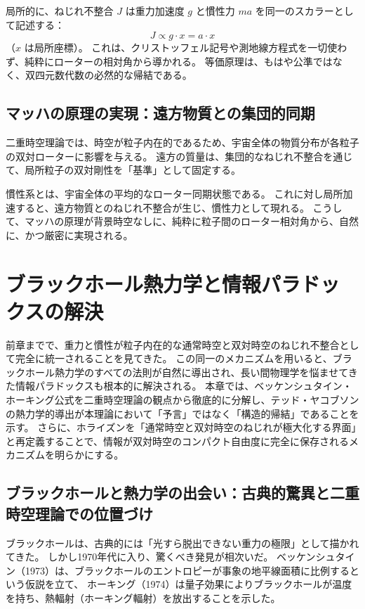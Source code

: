 \documentclass[dvipdfmx,a4paper]{jsbook}
\theoremstyle{definition}
\theoremstyle{remark}
\begin{document}
局所的に、ねじれ不整合 $J$ は重力加速度 $g$ と慣性力 $ma$ を同一のスカラーとして記述する：  
\begin{equation}
  J \propto g \cdot x = a \cdot x
  \label{eq:equivalence-J}
\end{equation}
（$x$ は局所座標）。  
これは、クリストッフェル記号や測地線方程式を一切使わず、純粋にローターの相対角から導かれる。  
等価原理は、もはや公準ではなく、双四元数代数の必然的な帰結である。

\section{マッハの原理の実現：遠方物質との集団的同期}
\label{sec:mach-realization}

二重時空理論では、時空が粒子内在的であるため、宇宙全体の物質分布が各粒子の双対ローターに影響を与える。  
遠方の質量は、集団的なねじれ不整合を通じて、局所粒子の双対剛性を「基準」として固定する。  

慣性系とは、宇宙全体の平均的なローター同期状態である。  
これに対し局所加速すると、遠方物質とのねじれ不整合が生じ、慣性力として現れる。  
こうして、マッハの原理が背景時空なしに、純粋に粒子間のローター相対角から、自然に、かつ厳密に実現される。

\chapter{ブラックホール熱力学と情報パラドックスの解決}
\label{chap:black-hole-thermodynamics}

前章までで、重力と慣性が粒子内在的な通常時空と双対時空のねじれ不整合として完全に統一されることを見てきた。
この同一のメカニズムを用いると、ブラックホール熱力学のすべての法則が自然に導出され、長い間物理学を悩ませてきた情報パラドックスも根本的に解決される。
本章では、ベッケンシュタイン・ホーキング公式を二重時空理論の観点から徹底的に分解し、テッド・ヤコブソンの熱力学的導出が本理論において「予言」ではなく「構造的帰結」であることを示す。
さらに、ホライズンを「通常時空と双対時空のねじれが極大化する界面」と再定義することで、情報が双対時空のコンパクト自由度に完全に保存されるメカニズムを明らかにする。

\section{ブラックホールと熱力学の出会い：古典的驚異と二重時空理論での位置づけ}

ブラックホールは、古典的には「光すら脱出できない重力の極限」として描かれてきた。
しかし1970年代に入り、驚くべき発見が相次いだ。
ベッケンシュタイン（1973）は、ブラックホールのエントロピーが事象の地平線面積に比例するという仮説を立て、
ホーキング（1974）は量子効果によりブラックホールが温度を持ち、熱輻射（ホーキング輻射）を放出することを示した。
\end{document}

